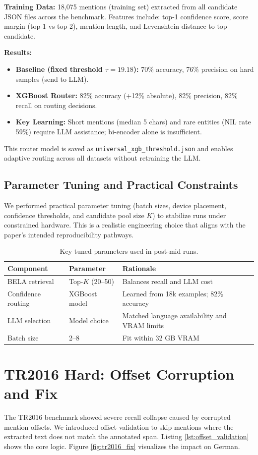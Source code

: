 \textbf{Training Data:} 18,075 mentions (training set) extracted from all candidate JSON files across the benchmark. Features include: top-1 confidence score, score margin (top-1 vs top-2), mention length, and Levenshtein distance to top candidate.

\textbf{Results:}
\begin{itemize}
    \item \textbf{Baseline (fixed threshold $\tau=19.18$):} 70\% accuracy, 76\% precision on hard samples (send to LLM).
    \item \textbf{XGBoost Router:} 82\% accuracy (+12\% absolute), 82\% precision, 82\% recall on routing decisions.
    \item \textbf{Key Learning:} Short mentions (median 5 chars) and rare entities (NIL rate 59\%) require LLM assistance; bi-encoder alone is insufficient.
\end{itemize}

This router model is saved as \texttt{universal\_xgb\_threshold.json} and enables adaptive routing across all datasets without retraining the LLM.

\subsection{Parameter Tuning and Practical Constraints}
We performed practical parameter tuning (batch sizes, device placement, confidence thresholds, and candidate pool size $K$) to stabilize runs under constrained hardware. This is a realistic engineering choice that aligns with the paper's intended reproducibility pathways.

\begin{table}[ht]
\centering
\caption{Key tuned parameters used in post-mid runs.}
\label{tab:tuned_params}
\begin{tabular}{lll}
\hline
Component & Parameter & Rationale \\
\hline
BELA retrieval & Top-$K$ (20--50) & Balances recall and LLM cost \\
Confidence routing & XGBoost model & Learned from 18k examples; 82\% accuracy \\
LLM selection & Model choice & Matched language availability and VRAM limits \\
Batch size & 2--8 & Fit within 32 GB VRAM \\
\hline
\end{tabular}
\end{table}

\section{TR2016 Hard: Offset Corruption and Fix}
The TR2016 benchmark showed severe recall collapse caused by corrupted mention offsets. We introduced offset validation to skip mentions where the extracted text does not match the annotated span. Listing \ref{lst:offset_validation} shows the core logic. Figure \ref{fig:tr2016_fix} visualizes the impact on German.

